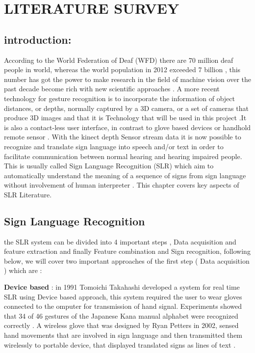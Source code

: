 

\chapter{LITERATURE SURVEY} \label{chapter1}

\section{introduction:} 

According to the World Federation of Deaf (WFD) \cite{wfd} there are 70 million deaf people in world, whereas the world population in 2012 exceeded 7 billion  , this number has got the power to make research in the field of machine vision  over  the  past  decade become rich with new scientific approaches .
A  more  recent   technology  for gesture   recognition  is to  incorporate   the  information   of object   distances,   or depths,   normally   captured   by a 3D camera,   or a set  of cameras  that  produce 3D images and that it is Technology that will be used in this project  .It is also a contact-less  user interface,   in contrast   to glove based   devices  or handhold  remote  sensor .
\newline
With the kinect depth Sensor stream data it is now possible to recognize and  translate sign language into speech and/or text in order to facilitate communication between normal hearing and hearing impaired people. This is usually called Sign Language Recognition (SLR) which  aim  to automatically understand the meaning of a sequence of signs from sign language without involvement of human interpreter \cite{27}. This chapter covers key aspects of SLR Literature.

\section{ Sign  Language Recognition}  

the SLR system can be divided into 4 important  steps , Data acquisition and feature extraction and finally Feature combination and Sign recognition, following below, we will cover two important approaches of the first step ( Data acquisition ) which are  :

\textbf{Device based }:
in  1991 Tomoichi Takahashi   developed a system for real time SLR  using Device based approach, this system required the user to wear gloves connected to the omputer for transmission of hand signal. Experiments showed that 34 of 46 gestures of the Japanese Kana manual alphabet were recognized correctly \cite{29}
.
A wireless glove that was designed by Ryan Petters  \cite{31}in 2002, sensed hand movements that are involved in sign language and then transmitted them wirelessly to portable device, that displayed translated signs as lines of text .


